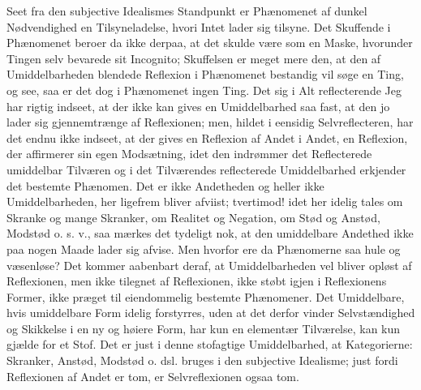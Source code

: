 \documentclass[11pt]{book}
\newcommand{\opage}[1]{\marginnote{\footnotesize\textit{[#1]}}}
\begin{document}
Seet fra den subjective Idealismes Standpunkt er Phænomenet
af dunkel Nødvendighed en Tilsyneladelse, hvori Intet lader
sig tilsyne. Det Skuffende i Phænomenet beroer da ikke
derpaa, at det skulde være som en Maske, hvorunder Tingen
selv bevarede sit Incognito; Skuffelsen er meget mere den, at
den af Umiddelbarheden blendede Reflexion i Phænomenet
bestandig vil søge en Ting, og see, saa er det dog i
Phænomenet ingen Ting. Det sig i Alt reflecterende Jeg har
rigtig indseet, at der ikke kan gives en Umiddelbarhed saa
fast, at den jo lader sig gjennemtrænge af Reflexionen; men,
hildet i eensidig Selvreflecteren, har det endnu ikke indseet, at
der gives en Reflexion af Andet i Andet, en Reflexion, der
affirmerer sin egen Modsætning, idet den indrømmer det
Reflecterede umiddelbar Tilværen og i det Tilværendes
reflecterede Umiddelbarhed erkjender det bestemte Phænomen.
Det
\opage{83} \setcounter{footnote}{0}%
er ikke Andetheden og heller ikke Umiddelbarheden, her
ligefrem bliver afviist; tvertimod! idet her idelig tales om
Skranke og mange Skranker, om Realitet og Negation, om
Stød og Anstød, Modstød o. s. v., saa mærkes det tydeligt
nok, at den umiddelbare Andethed ikke paa nogen Maade
lader sig afvise. Men hvorfor ere da Phænomerne saa hule
og væsenløse? Det kommer aabenbart deraf, at Umiddelbarheden
vel bliver opløst af Reflexionen, men ikke tilegnet af
Reflexionen, ikke støbt igjen i Reflexionens Former, ikke præget
til eiendommelig bestemte Phænomener. Det Umiddelbare, hvis
umiddelbare Form idelig forstyrres, uden at det derfor vinder
Selvstændighed og Skikkelse i en ny og høiere Form, har kun
en elementær Tilværelse, kan kun gjælde for et Stof. Det er
just i denne stofagtige Umiddelbarhed, at Kategorierne:
Skranker, Anstød, Modstød o. dsl. bruges i den subjective
Idealisme; just fordi Reflexionen af Andet er tom, er
Selvreflexionen ogsaa tom.
\end{document}
